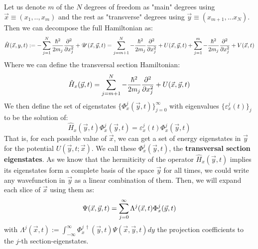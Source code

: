 \documentclass[11pt, a4paper]{article} %
\newcommand{\U}{\mathscr{U}}
\begin{document}
Let us denote $m$ of the $N$ degrees of freedom as "main" degrees using $\vec{x}\equiv(x_1,..,x_m)$ and the rest as "transverse" degrees using $\vec{y}\equiv(x_{m+1},...x_N)$. Then we can decompose the full Hamiltonian as:
\begin{equation}
\hat{H}(\vec{x}, y, t):= -\sum_{j=1}^N\frac{\hbar^2}{2m_j}\pdv[2]{}{x_j}+\U(\vec{x}, \vec{y}, t)=\sum_{j=m+1}^{N}-\frac{\hbar^2}{2m_j}\pdv[2]{}{x_j}+U(\vec{x}, \vec{y}, t)+\sum_{j=1}^{m}-\frac{\hbar^2}{2m_j}\pdv[2]{}{x_j}+V(\vec{x},t)
\end{equation}
Where we can define the transversal section Hamiltonian:\vspace{-0.05cm}
\begin{equation}
\hat{H}_x(\vec{y},t)=\sum_{j=m+1}^{N}-\frac{\hbar^2}{2m_j}\pdv[2]{}{x_j}+U(\vec{x}, \vec{y}, t)\vspace{-0.1cm}
\end{equation} \vspace{-0.2cm}
We then define the set of eigenstates $\{\Phi^j_x(\vec{y},t)\}_{j=0}^\infty$ with eigenvalues $\{\varepsilon_x^j(t)\}_j$ to be the solution of:\vspace{0.2cm}
\begin{equation}\label{transvE}
\hat{H}_x(\vec{y},t)\Phi^j_x(\vec{y},t)=\varepsilon^j_x(t)\Phi^j_x(\vec{y},t)
\end{equation}
That is, for each possible value of $\vec{x}$, we can get a set of energy eigenstates in $\vec{y}$ for the potential $U(\vec{y},t;\vec{x})$. We call these $\Phi^j_x(\vec{y},t)$, the {\bf transversal section eigenstates}. As we know that the hermiticity of the operator $\hat{H}_x(\vec{y},t)$ implies its eigenstates form a complete basis of the space $\vec{y}$ for all times, we could write any wavefunction in $\vec{y}$ as a linear combination of them. Then, we will expand each slice of $\vec{x}$ using them as:\vspace{-0.2cm}
\begin{equation}\label{BHExp}
\Psi(\vec{x},\vec{y},t)=\sum_{j=0}^\infty \Lambda^j(\vec{x},t) \Phi^j_x(\vec{y},t)\vspace{-0.2cm}
\end{equation}
with $\Lambda^j(\vec{x},t):= \int_{-\infty}^{\infty}\Phi^{j\ \dagger}_x(\vec{y},t) \Psi(\vec{x},\vec{y},t)dy$ the projection coefficients to the $j$-th section-eigenstates.
\end{document}
